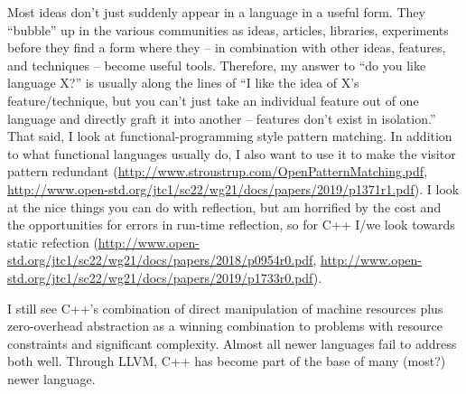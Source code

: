 \documentclass[10pt, a5paper]{article}
\begin{document}
\begin{Parallel}[p]{}{}
{Most ideas don’t just suddenly appear in a language in a useful form. They “bubble” up in the various communities as ideas, articles, libraries, experiments before they find a form where they – in combination with other ideas, features, and techniques – become useful tools. Therefore, my answer to “do you like language X?” is usually along the lines of “I like the idea of X’s feature/technique, but you can’t just take an individual feature out of one language and directly graft it into another – features don’t exist in isolation.” That said, I look at functional-programming style pattern matching. In addition to what functional languages usually do, I also want to use it to make the visitor pattern redundant (\url{http://www.stroustrup.com/OpenPatternMatching.pdf}, \url{http://www.open-std.org/jtc1/sc22/wg21/docs/papers/2019/p1371r1.pdf}). I look at the nice things you can do with reflection, but am horrified by the cost and the opportunities for errors in run-time reflection, so for C++ I/we look towards static refection (\url{http://www.open-std.org/jtc1/sc22/wg21/docs/papers/2018/p0954r0.pdf}, \url{http://www.open-std.org/jtc1/sc22/wg21/docs/papers/2019/p1733r0.pdf}). 

I still see C++’s combination of direct manipulation of machine resources plus zero-overhead abstraction as a winning combination to problems with resource constraints and significant complexity. Almost all newer languages fail to address both well.
Through LLVM, C++ has become part of the base of many (most?) newer language.

\vfill
     }
\end{Parallel}
\end{document}
